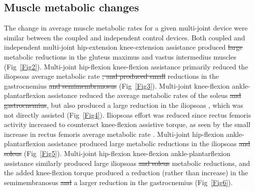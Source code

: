 \documentclass[10pt,letterpaper]{article}
\providecommand{\DIFaddtex}[1]{{\protect\color{blue}{#1}}} %
\providecommand{\DIFdeltex}[1]{{\protect\color{red}\sout{#1}}}                      %
\providecommand{\DIFaddbegin}{} %
\providecommand{\DIFaddend}{} %
\providecommand{\DIFdelbegin}{} %
\providecommand{\DIFdelend}{} %
\providecommand{\DIFadd}[1]{\texorpdfstring{\DIFaddtex{#1}}{#1}} %
\providecommand{\DIFdel}[1]{\texorpdfstring{\DIFdeltex{#1}}{}} %
\newcommand{\DIFscaledelfig}{0.5}
\newlength{\DIFdelgraphicswidth} %
\newlength{\DIFdelgraphicsheight} %
\newcommand{\DIFaddincludegraphics}[2][]{{\color{blue}\fbox{\DIFOincludegraphics[#1]{#2}}}} %
\newcommand{\DIFdelincludegraphics}[2][]{%
\sbox{\DIFdelgraphicsbox}{\DIFOincludegraphics[#1]{#2}}%
\settoboxwidth{\DIFdelgraphicswidth}{\DIFdelgraphicsbox} %
\settoboxtotalheight{\DIFdelgraphicsheight}{\DIFdelgraphicsbox} %
\scalebox{\DIFscaledelfig}{%
\parbox[b]{\DIFdelgraphicswidth}{\usebox{\DIFdelgraphicsbox}\\[-\baselineskip] \rule{\DIFdelgraphicswidth}{0em}}\llap{\resizebox{\DIFdelgraphicswidth}{\DIFdelgraphicsheight}{%
\setlength{\unitlength}{\DIFdelgraphicswidth}%
\begin{picture}(1,1)%
\thicklines\linethickness{2pt} %
{\color[rgb]{1,0,0}\put(0,0){\framebox(1,1){}}}%
{\color[rgb]{1,0,0}\put(0,0){\line( 1,1){1}}}%
{\color[rgb]{1,0,0}\put(0,1){\line(1,-1){1}}}%
\end{picture}%
}*{3pt}}} %
} %
\DeclareRobustCommand{\DIFaddbegin}{\DIFOaddbegin \let\includegraphics\DIFaddincludegraphics} %
\DeclareRobustCommand{\DIFaddend}{\DIFOaddend \let\includegraphics\DIFOincludegraphics} %
\DeclareRobustCommand{\DIFdelbegin}{\DIFOdelbegin \let\includegraphics\DIFdelincludegraphics} %
\DeclareRobustCommand{\DIFdelend}{\DIFOaddend \let\includegraphics\DIFOincludegraphics} %
\begin{document}
\subsection*{Muscle metabolic changes}
The change in average muscle metabolic rates for a given multi-joint device were similar between the coupled and independent control devices. Both coupled and independent multi-joint hip-extension knee-extension assistance produced \DIFdelbegin \DIFdel{large }\DIFdelend metabolic reductions in the gluteus maximus \DIFaddbegin \DIFadd{(5\% coupled, 6\% independent) }\DIFaddend and vastus intermedius \DIFaddbegin \DIFadd{(6\% coupled and independent) }\DIFaddend muscles (Fig~\ref{Fig2}). Multi-joint hip-flexion knee-flexion assistance primarily reduced the iliopsoas average metabolic rate \DIFdelbegin \DIFdel{, and produced small }\DIFdelend \DIFaddbegin \DIFadd{(19\% coupled, 20\% independent), and produced smaller }\DIFaddend reductions in the gastrocnemius \DIFdelbegin \DIFdel{and semimembranosus }\DIFdelend (\DIFaddbegin \DIFadd{4\% coupled and independent) and semimembranosus (2\% coupled and independent) (}\DIFaddend Fig~\ref{Fig3}). Multi-joint knee-flexion ankle-plantarflexion assistance reduced the average metabolic rates of the soleus \DIFdelbegin \DIFdel{and gastrocnemius}\DIFdelend \DIFaddbegin \DIFadd{(11\% coupled, 14\% independent) and gastrocnemius (4\% coupled and independent)}\DIFaddend , but also produced a large reduction in the iliopsoas \DIFaddbegin \DIFadd{(15\% coupled and independent)}\DIFaddend , which was not directly assisted (Fig~\ref{Fig4}). Iliopsoas effort was reduced since rectus femoris activity increased to counteract knee-flexion assistive torque, as seen by the small increase in rectus femoris average metabolic rate \DIFaddbegin \DIFadd{(4\% coupled and independent)}\DIFaddend . Multi-joint hip-flexion ankle-plantarflexion assistance produced large metabolic reductions in the iliopsoas \DIFdelbegin \DIFdel{and soleus }\DIFdelend (\DIFaddbegin \DIFadd{19\% coupled and independent) and soleus (12\% coupled, 14\% independent) (}\DIFaddend Fig~\ref{Fig5}). Multi-joint hip-flexion knee-flexion ankle-plantarflexion assistance similarly produced large iliopsoas \DIFdelbegin \DIFdel{and soleus }\DIFdelend \DIFaddbegin \DIFadd{(18\% coupled, 19\% independent) and soleus (11\% coupled, 13\% independent) }\DIFaddend metabolic reductions, and the added knee-flexion torque produced a reduction (rather than increase) in the semimembranosus \DIFdelbegin \DIFdel{and }\DIFdelend \DIFaddbegin \DIFadd{(2\% coupled and independent) and }\DIFaddend a larger reduction in the gastrocnemius (\DIFaddbegin \DIFadd{4\% coupled and independent) (}\DIFaddend Fig~\ref{Fig6}).
\end{document}
